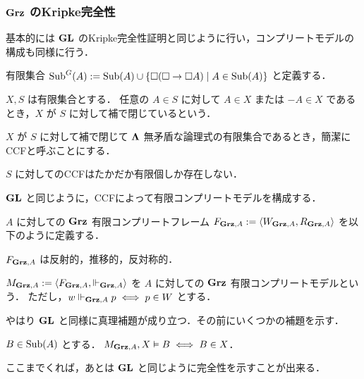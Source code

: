 \documentclass{jlreq}
\begin{document}
\subsubsection{$\mathbf{Grz}$ のKripke完全性}

基本的には $\mathbf{GL}$ のKripke完全性証明と同じように行い，コンプリートモデルの構成も同様に行う．

\begin{definition}
	有限集合 $\mathrm{Sub}^G(A) := \mathrm{Sub}(A) \cup \{ \Box(\Box \to \Box A) \mid A \in \mathrm{Sub}(A) \}$ と定義する．
\end{definition}

\begin{definition}
	$X, S$ は有限集合とする．
	任意の $A \in S$ に対して $A \in X$ または $-A \in X$ であるとき，$X$ が $S$ に対して補で閉じているという．

	$X$ が $S$ に対して補で閉じて $\mathbf{\Lambda}$ 無矛盾な論理式の有限集合であるとき，簡潔にCCFと呼ぶことにする．
\end{definition}

\begin{lemma}
	$S$ に対してのCCFはたかだか有限個しか存在しない．
\end{lemma}

$\mathbf{GL}$ と同じように，CCFによって有限コンプリートモデルを構成する．
\begin{definition}
	$A$ に対しての $\mathbf{Grz}$ 有限コンプリートフレーム $F_{\mathbf{Grz}, A} := \langle W_{\mathbf{Grz}, A}, R_{\mathbf{Grz}, A} \rangle$ を以下のように定義する．
\end{definition}

\begin{lemma}
	$F_{\mathbf{Grz}, A}$ は反射的，推移的，反対称的．
\end{lemma}

\begin{definition}
	$M_{\mathbf{Grz}, A} := \langle F_{\mathbf{Grz}, A}, \Vdash_{\mathbf{Grz}, A} \rangle$ を $A$ に対しての $\mathbf{Grz}$ 有限コンプリートモデルという．
	ただし，$w \Vdash_{\mathbf{Grz}, A} p \iff p \in W$ とする．
\end{definition}

やはり $\mathbf{GL}$ と同様に真理補題が成り立つ．その前にいくつかの補題を示す．

\begin{lemma}\label{lem:Grz_truthlemma}
	$B \in \mathrm{Sub}(A)$ とする．
	$M_{\mathbf{Grz}, A}, X \vDash B \iff B \in X$．
\end{lemma}

ここまでくれば，あとは $\mathbf{GL}$ と同じように完全性を示すことが出来る．
\end{document}
